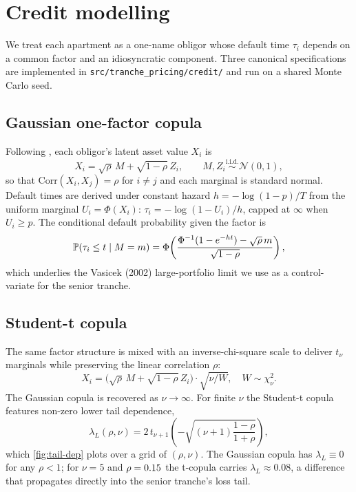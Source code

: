 \section{Credit modelling}\label{sec:credit}

We treat each apartment as a one-name obligor whose default time
$\tau_i$ depends on a common factor and an idiosyncratic component.
Three canonical specifications are implemented in
\texttt{src/tranche\_pricing/credit/} and run on a shared Monte Carlo
seed.

\subsection{Gaussian one-factor copula}\label{ssec:gauss-copula}

Following \autocite{Li2000, Vasicek2002}, each obligor's latent asset value
$X_i$ is
\begin{equation}
X_i = \sqrt{\rho}\, M + \sqrt{1 - \rho}\, Z_i,
\qquad M, Z_i \overset{\text{i.i.d.}}{\sim} \mathcal{N}(0, 1),
\label{eq:gauss-copula}
\end{equation}
so that $\text{Corr}(X_i, X_j) = \rho$ for $i \neq j$ and each marginal is
standard normal. Default times are derived under constant hazard
$h = -\log(1 - p) / T$ from the uniform marginal $U_i = \Phi(X_i)$:
$\tau_i = -\log(1 - U_i) / h$, capped at $\infty$ when $U_i \ge p$. The
conditional default probability given the factor is
\begin{equation}
\mathbb{P}(\tau_i \le t \mid M = m) = \Phi\!\left(
\frac{\Phi^{-1}(1 - e^{-h t}) - \sqrt{\rho}\, m}{\sqrt{1 - \rho}}
\right),
\label{eq:cond-pd}
\end{equation}
which underlies the Vasicek (2002) large-portfolio limit we use as a
control-variate for the senior tranche.

\subsection{Student-t copula}\label{ssec:t-copula}

The same factor structure is mixed with an inverse-chi-square scale to
deliver $t_\nu$ marginals while preserving the linear correlation $\rho$:
\begin{equation}
X_i = \bigl(\sqrt{\rho}\, M + \sqrt{1 - \rho}\, Z_i\bigr) \cdot
\sqrt{\nu / W}, \quad W \sim \chi^2_{\nu}.
\label{eq:t-copula}
\end{equation}
The Gaussian copula is recovered as $\nu \to \infty$. For finite $\nu$ the
Student-t copula features non-zero lower tail dependence,
\begin{equation}
\lambda_L(\rho, \nu) = 2\, t_{\nu + 1}\!\left(-\sqrt{(\nu + 1)\frac{1 - \rho}{1 + \rho}}\right),
\label{eq:tail-dep}
\end{equation}
which \cref{fig:tail-dep} plots over a grid of $(\rho, \nu)$. The Gaussian
copula has $\lambda_L \equiv 0$ for any $\rho < 1$; for $\nu = 5$ and
$\rho = 0.15{}$ the t-copula carries
$\lambda_L \approx 0.08$, a difference that propagates directly into the
senior tranche's loss tail.

